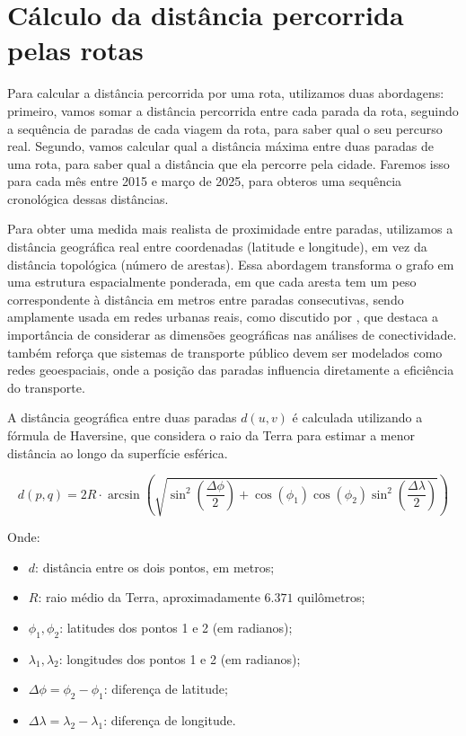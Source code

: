 \section{Cálculo da distância percorrida pelas rotas}

Para calcular a distância percorrida por uma rota, utilizamos duas abordagens: primeiro, vamos somar a distância percorrida entre cada parada da rota, seguindo a sequência de paradas de cada viagem da rota, para saber qual o seu percurso real. Segundo, vamos calcular qual a distância máxima entre duas paradas de uma rota, para saber qual a distância que ela percorre pela cidade. Faremos isso para cada mês entre 2015 e março de 2025, para obteros uma sequência cronológica dessas distâncias.

Para obter uma medida mais realista de proximidade entre paradas, utilizamos a distância geográfica real entre coordenadas (latitude e longitude), em vez da distância topológica (número de arestas). Essa abordagem transforma o grafo em uma estrutura espacialmente ponderada, em que cada aresta tem um peso correspondente à distância em metros entre paradas consecutivas, sendo amplamente usada em redes urbanas reais, como discutido por \citep{barthelemy2011spatial}, que destaca a importância de considerar as dimensões geográficas nas análises de conectividade. \citet{rodrigue2020geography} também reforça que sistemas de transporte público devem ser modelados como redes geoespaciais, onde a posição das paradas influencia diretamente a eficiência do transporte.

A distância geográfica entre duas paradas $d(u,v)$ é calculada utilizando a fórmula de Haversine, que considera o raio da Terra para estimar a menor distância ao longo da superfície esférica. 

\begin{equation}
d(p, q) = 2R \cdot \arcsin\left( \sqrt{ \sin^2\left( \frac{\Delta \phi}{2} \right) + \cos(\phi_1) \cos(\phi_2) \sin^2\left( \frac{\Delta \lambda}{2} \right) } \right)
\end{equation}

\noindent
Onde:
\begin{itemize}
  \item \( d \): distância entre os dois pontos, em metros;
  \item \( R \): raio médio da Terra, aproximadamente \( 6.371 \) quilômetros;
  \item \( \phi_1, \phi_2 \): latitudes dos pontos 1 e 2 (em radianos);
  \item \( \lambda_1, \lambda_2 \): longitudes dos pontos 1 e 2 (em radianos);
  \item \( \Delta \phi = \phi_2 - \phi_1 \): diferença de latitude;
  \item \( \Delta \lambda = \lambda_2 - \lambda_1 \): diferença de longitude.
\end{itemize}

